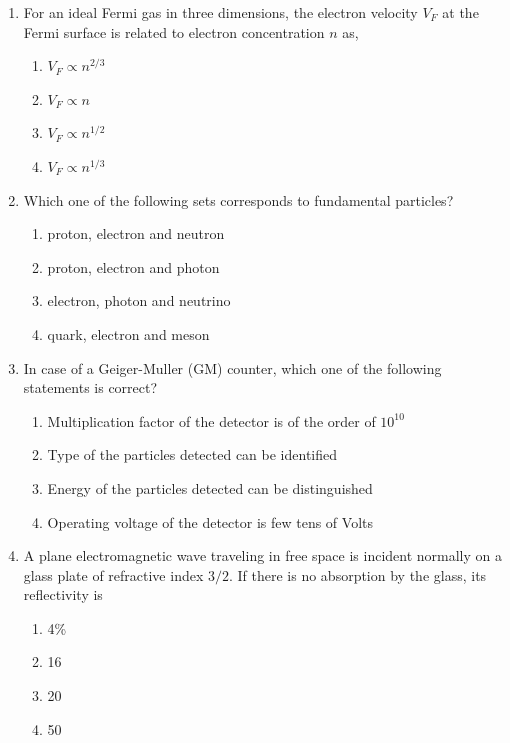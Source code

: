 \documentclass[journal,12pt,onecolumn]{IEEEtran}
\theoremstyle{remark}
\begin{document}
\begin{enumerate}
\item For an ideal Fermi gas in three dimensions, the electron velocity $V_{F}$ at the Fermi surface is related to electron concentration $n$ as,
\begin{multicols}{4}
\begin{enumerate}
\item $V_{F} \propto n^{2/3}$
\item $V_{F} \propto n$
\item $V_{F} \propto n^{1/2}$
\item $V_{F} \propto n^{1/3}$
\end{enumerate}
\end{multicols}

\item Which one of the following sets corresponds to fundamental particles?

\begin{enumerate}
\item proton, electron and neutron
\item proton, electron and photon
\item electron, photon and neutrino
\item quark, electron and meson
\end{enumerate}

\item In case of a Geiger-Muller (GM) counter, which one of the following statements is correct?

\begin{enumerate}
\item Multiplication factor of the detector is of the order of $10^{10}$
\item Type of the particles detected can be identified
\item Energy of the particles detected can be distinguished
\item Operating voltage of the detector is few tens of Volts
\end{enumerate}


\item A plane electromagnetic wave traveling in free space is incident normally on a glass plate of refractive index $3/2$. If there is no absorption by the glass, its reflectivity is
\begin{multicols}{4}
\begin{enumerate}
\item 4\%
\item 16%
\item 20%
\item 50%
\end{enumerate}
\end{multicols}


\end{enumerate}
\end{document}
